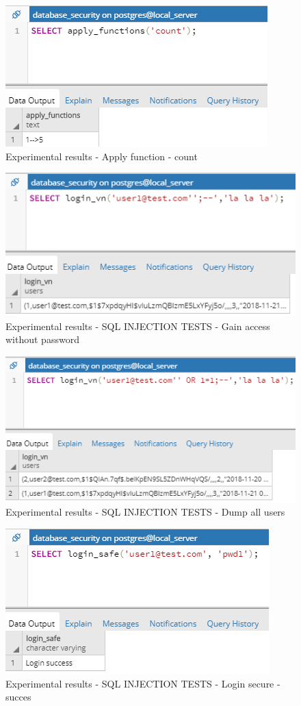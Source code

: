 \documentclass{article}
\begin{document}
\begin{figure}
\centering
\includegraphics[scale=1]{r3}
\caption{Experimental results - Apply function - count}
\end{figure}
\begin{figure}
\centering
\includegraphics[scale=1]{r4}
\caption{Experimental results - SQL INJECTION TESTS - Gain access without password}
\end{figure}
\begin{figure}
\centering
\includegraphics[scale=1]{r5}
\caption{Experimental results - SQL INJECTION TESTS - Dump all users}
\end{figure}
\begin{figure}
\centering
\includegraphics[scale=1]{r6}
\caption{Experimental results - SQL INJECTION TESTS - Login secure - succes}
\end{figure}
\end{document}
